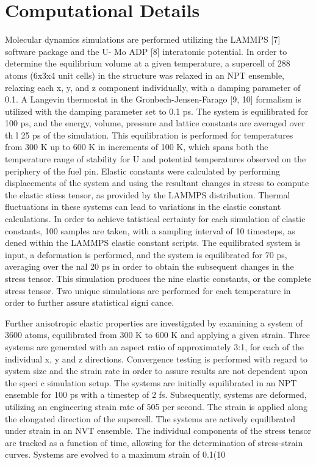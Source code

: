 \documentclass[review]{elsarticle}
\begin{document}
\FloatBarrier

\section{Computational Details}

Molecular dynamics simulations are performed utilizing the LAMMPS [7] software package and the U- Mo ADP [8] interatomic potential. In order to determine the equilibrium volume at a given temperature, a supercell of 288 atoms (6x3x4 unit cells) in the structure was relaxed in an NPT ensemble, relaxing each x, y, and z component individually, with a damping parameter of 0.1. A Langevin thermostat in the Gronbech-Jensen-Farago [9, 10] formalism is utilized with the damping parameter set to 0.1 ps. The system is equilibrated for 100 ps, and the energy, volume, pressure and lattice constants are averaged over th l 25 ps of the simulation. This equilibration is performed for temperatures from 300 K up to 600 K in increments of 100 K, which spans both the temperature range of stability for U and potential temperatures observed on the periphery of the fuel pin. Elastic constants were calculated by performing displacements of the system and using the resultant changes in stress to compute the elastic stiess tensor, as provided by the LAMMPS distribution. Thermal fluctuations in these systems can lead to variations in the elastic constant calculations. In order to achieve tatistical certainty for each simulation of elastic constants, 100 samples are taken, with a sampling interval of 10 timesteps, as dened within the LAMMPS elastic constant scripts. The equilibrated system is input, a deformation is performed, and the system is equilibrated for 70 ps, averaging over the nal 20 ps in order to obtain the subsequent changes in the stress tensor. This simulation produces the nine elastic constants, or the complete stress tensor. Two unique simulations are performed for each temperature in order to further assure statistical signi cance.

Further anisotropic elastic properties are investigated by examining a system of 3600 atoms, equilibrated from 300 K to 600 K and applying a given strain. Three systems are generated with an aspect ratio of approximately 3:1, for each of the individual x, y and z directions. Convergence testing is performed with regard to system size and the strain rate in order to assure results are not dependent upon the speci c simulation setup. The systems are initially equilibrated in an NPT ensemble for 100 ps with a timestep of 2 fs. Subsequently, systems are deformed, utilizing an engineering strain rate of 505 per second. The strain is applied along the elongated direction of the supercell. The systems are actively equilibrated under strain in an NVT ensemble. The individual components of the stress tensor are tracked as a function of time, allowing for the determination of stress-strain curves. Systems are evolved to a maximum strain of 0.1(10%
\end{document}
